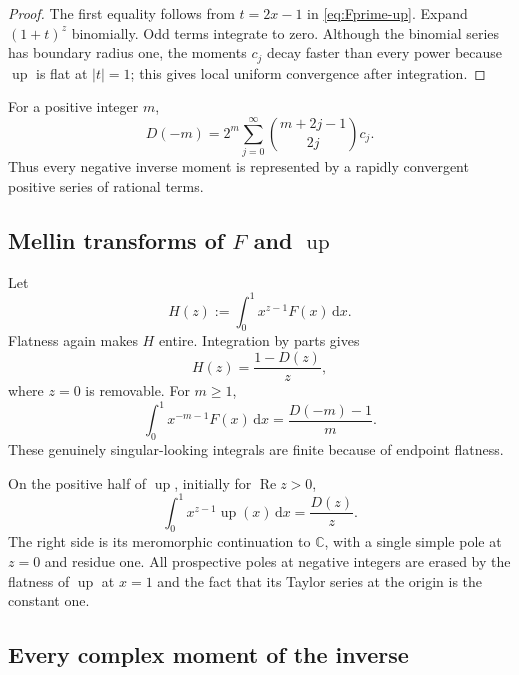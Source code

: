 \documentclass[11pt]{article}
\theoremstyle{definition}
\theoremstyle{remark}
\DeclareMathOperator{\upf}{up}
\DeclareMathOperator{\RePart}{Re}
\newcommand{\C}{\mathbb C}
\newcommand{\dd}{\,\mathrm d}
\newcommand{\abs}[1]{\lvert#1\rvert}
\begin{document}
\begin{proof}
The first equality follows from \(t=2x-1\) in \eqref{eq:Fprime-up}.  Expand
\((1+t)^z\) binomially.  Odd terms integrate to zero.  Although the binomial series has
boundary radius one, the moments \(c_j\) decay faster than every power because \(\upf\)
is flat at \(\abs{t}=1\); this gives local uniform convergence after integration.
\end{proof}

For a positive integer \(m\),
\begin{equation}
 D(-m)=2^m\sum_{j=0}^{\infty}
 \binom{m+2j-1}{2j}c_j.                                  \label{eq:D-negative-integer}
\end{equation}
Thus every negative inverse moment is represented by a rapidly convergent positive
series of rational terms.

\subsection{Mellin transforms of \(F\) and \(\upf\)}

Let
\begin{equation}
 H(z):=\int_0^1x^{z-1}F(x)\dd x.                          \label{eq:H-def}
\end{equation}
Flatness again makes \(H\) entire.  Integration by parts gives
\begin{equation}
 \boxed{H(z)=\frac{1-D(z)}{z}},                            \label{eq:H-D}
\end{equation}
where \(z=0\) is removable.  For \(m\ge1\),
\begin{equation}
 \int_0^1x^{-m-1}F(x)\dd x=\frac{D(-m)-1}{m}.            \label{eq:negative-F-moments}
\end{equation}
These genuinely singular-looking integrals are finite because of endpoint flatness.

On the positive half of \(\upf\), initially for \(\RePart z>0\),
\begin{equation}
 \int_0^1x^{z-1}\upf(x)\dd x=\frac{D(z)}{z}.             \label{eq:up-mellin}
\end{equation}
The right side is its meromorphic continuation to \(\C\), with a single simple pole at
\(z=0\) and residue one.  All prospective poles at negative integers are erased by the
flatness of \(\upf\) at \(x=1\) and the fact that its Taylor series at the origin is the
constant one.

\subsection{Every complex moment of the inverse}
\end{document}
